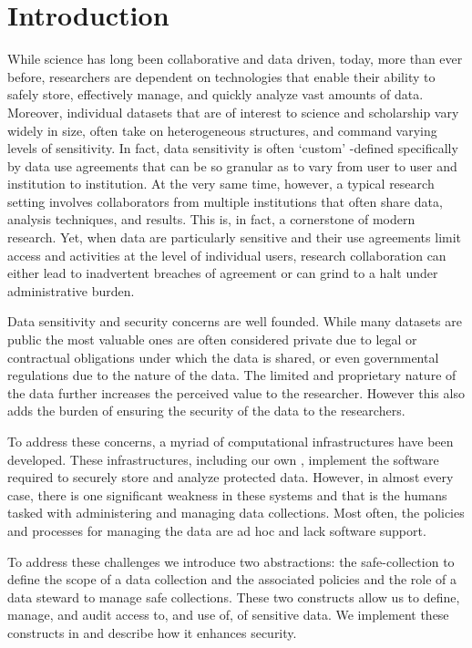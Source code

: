 \section{Introduction}



While science has long been collaborative and data driven, today, more than ever before, 
researchers are dependent on technologies that enable their ability to safely store, 
effectively manage, and quickly analyze vast amounts of
data. Moreover, individual datasets that are of interest to science and scholarship 
vary widely in size, often take on heterogeneous structures, and command varying 
levels of sensitivity. In fact, data sensitivity is often `custom' -defined specifically by
data use agreements that can be so granular as to vary from user to user and institution 
to institution. At the very same time, however, a typical research setting involves 
collaborators from multiple institutions that often share data, analysis techniques, 
and results. This is, in fact, a cornerstone of modern research. Yet, when data are 
particularly sensitive and their use agreements limit access and activities at the 
level of individual users, research collaboration can either lead to inadvertent 
breaches of agreement or can grind to a halt under administrative burden.



Data sensitivity and security concerns are well founded. While many datasets are public the most
valuable ones are often considered private due to legal or contractual obligations under which the data
is shared, or even governmental regulations due to the nature of the data. The limited and proprietary nature
of the data further increases the perceived value to the researcher. However this also adds the burden of
ensuring the security of the data to the researchers.

To address these concerns, a myriad of computational infrastructures
have been developed. These infrastructures, including our own \NAMENS, 
implement the software required to securely store and analyze protected
data. However, in almost every case, there is one significant weakness in these systems
and that is the humans tasked with administering and managing 
data collections. Most often, the policies and processes for managing
the data are ad hoc and lack software support. 

To address these challenges we introduce two abstractions: 
the safe-collection to define the scope of a data collection
and the associated policies and the role of a data steward
to manage safe collections.  These two constructs allow us 
to define, manage, and audit access to, and use of, of 
sensitive data.  We implement these constructs in \NAME and
describe how it enhances security.  


